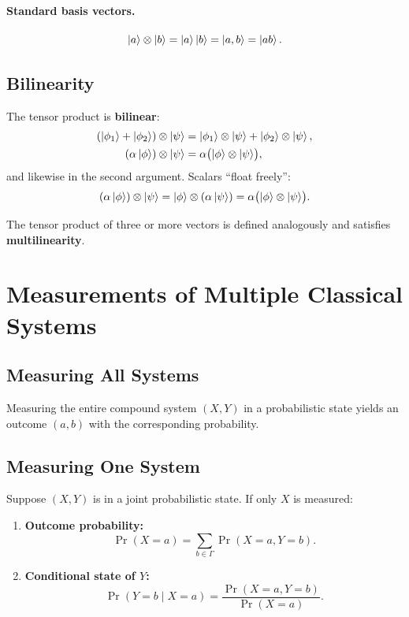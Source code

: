 \documentclass[11pt]{article}
\theoremstyle{definition}
\begin{document}
\paragraph{Standard basis vectors.}
\[
    \ket{a}\otimes\ket{b} = \ket{a}\ket{b} = \ket{a,b} = \ket{ab}.
\]

\subsection{Bilinearity}

The tensor product is \textbf{bilinear}:
\begin{align}
    (\ket{\phi_1}+\ket{\phi_2})\otimes\ket{\psi}
        &= \ket{\phi_1}\otimes\ket{\psi}+\ket{\phi_2}\otimes\ket{\psi}, \\
    (\alpha\ket{\phi})\otimes\ket{\psi}
        &= \alpha\bigl(\ket{\phi}\otimes\ket{\psi}\bigr),
\end{align}
and likewise in the second argument.  Scalars ``float freely'':
\[
    (\alpha\ket{\phi})\otimes\ket{\psi}
    = \ket{\phi}\otimes(\alpha\ket{\psi})
    = \alpha\bigl(\ket{\phi}\otimes\ket{\psi}\bigr).
\]

The tensor product of three or more vectors is defined analogously and satisfies \textbf{multilinearity}.

\section{Measurements of Multiple Classical Systems}

\subsection{Measuring All Systems}

Measuring the entire compound system $(X,Y)$ in a probabilistic state yields an outcome $(a,b)$ with the corresponding probability.

\subsection{Measuring One System}

Suppose $(X,Y)$ is in a joint probabilistic state.  If only $X$ is measured:
\begin{enumerate}
    \item \textbf{Outcome probability:}
    \[
        \Pr(X=a) = \sum_{b\in\Gamma}\Pr(X=a,Y=b).
    \]
    \item \textbf{Conditional state of $Y$:}
    \[
        \Pr(Y=b\mid X=a) = \frac{\Pr(X=a,Y=b)}{\Pr(X=a)}.
    \]
\end{enumerate}
\end{document}
